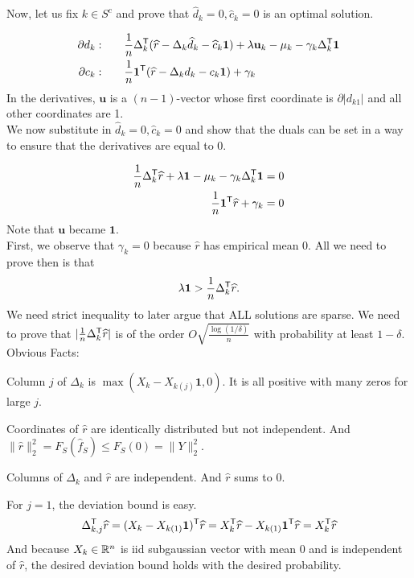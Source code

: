 \documentclass{article}
\begin{document}
Now, let us fix $k \in S^c$ and prove that $\hat{d}_k = 0, \hat{c}_k=0$ is an optimal solution. 

\begin{align*}
\partial d_k :& \qquad \frac{1}{n} \Delta_k^{\mathsf{T}} ( \widehat{r} - \Delta_k \widehat{d}_k - \widehat{c}_k \mathbf{1}) + \lambda \mathbf{u}_k  - \mu_k - \gamma_k \Delta_k^{\mathsf{T}} \mathbf{1} \\
\partial c_k: & \qquad \frac{1}{n} \mathbf{1}^{\mathsf{T}} ( \widehat{r} - \Delta_k d_k - c_k \mathbf{1}) + \gamma_k
\end{align*}
In the derivatives, $\mathbf{u}$ is a $(n-1)$-vector whose first coordinate is $\partial | d_{k1}|$ and all other coordinates are 1.\\


We now substitute in $\hat{d}_k = 0, \hat{c}_k=0$ and show that the duals can be set in a way to ensure that the derivatives are equal to 0.

\begin{align*}
\frac{1}{n} \Delta_k^{\mathsf{T}}\widehat{r} + \lambda \mathbf{1}  - \mu_k - \gamma_k \Delta_k^{\mathsf{T}} \mathbf{1} &= 0 \\
\frac{1}{n} \mathbf{1}^{\mathsf{T}} \widehat{r} + \gamma_k & = 0 \\
\end{align*}
Note that $\mathbf{u}$ became $\mathbf{1}$.\\

First, we observe that $\gamma_k = 0$ because $\hat{r}$ has empirical mean 0. All we need to prove then is that 
\[
\lambda \mathbf{1} > \frac{1}{n} \Delta_k^{\mathsf{T}}\widehat{r}. 
\]
We need strict inequality to later argue that ALL solutions are sparse. We need to prove that $| \frac{1}{n} \Delta_k^{\mathsf{T}}\widehat{r}|$ is of the order $O\sqrt{ \frac{\log(1/\delta)}{n}}$ with probability at least $1- \delta$. \\

Obvious Facts:
\begin{packed_enum}
\item Column $j$ of $\Delta_k$ is $ \max( X_k - X_{k(j)} \mathbf{1}, 0)$. It is all positive with many zeros for large $j$.
\item Coordinates of $\hat{r}$ are identically distributed but not independent. And $\| \hat{r} \|_2^2 = F_S(\hat{f}_S) \leq F_S(0) = \| Y \|_2^2$. 
\item Columns of $\Delta_k$ and $\hat{r}$ are independent. And $\hat{r}$ sums to 0.
\end{packed_enum}

For $j=1$, the deviation bound is easy. 
\[
\Delta_{k, j}^{\mathsf{T}} \widehat{r} = (X_k  - X_{k(1)} \mathbf{1})^{\mathsf{T}} \widehat{r} = X_k^{\mathsf{T}} \widehat{r} - X_{k(1)} \mathbf{1}^{\mathsf{T}} \widehat{r} = X_k^{\mathsf{T}} \widehat{r} 
\]
And because $X_k \in \mathbb{R}^n$ is iid subgaussian vector with mean 0 and is independent of $\hat{r}$, the desired deviation bound holds with the desired probability.\\
\end{document}

